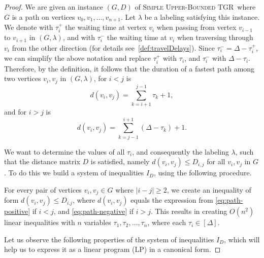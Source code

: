\documentclass[a4paper,UKenglish,cleveref, autoref, thm-restate]{lipics-v2021}
\newcommand{\deltaUpperBound}{\textsc{Simple Upper-Bounded TGR}}
\begin{document}
\begin{proof}
We are given an instance  $(G,D)$ of \deltaUpperBound\, where $G$ is a path on vertices $v_0, v_1, \dots, v_{n+1}$. 
Let $\lambda$ be a labeling satisfying this instance.
We denote with $\tau_i^+$ the waiting time at vertex $v_i$ when passing from vertex $v_{i-1}$ to $v_{i+1}$ in $(G,\lambda)$,
and with $\tau_i^-$ the waiting time at $v_i$ when traversing through $v_i$ from the other direction (for details see~\cref{def:travelDelays}).
Since $\tau_i^- = \Delta - \tau_i^+$, 
we can simplify the above notation and replace $\tau_i^+$ with $\tau_i$, and $\tau_i^-$ with $ \Delta - \tau_i$.
Therefore, by the definition, it follows that the duration of a fastest path among two vertices $v_i, v_j$ in $(G,\lambda)$, for $i < j$
is 
\begin{equation}\label{eq:path-positive}
    d(v_i,v_j)=\sum_{k = i+1}^{j-1} \tau_k + 1,
\end{equation}
and for $i > j$ is 
\begin{equation}\label{eq:path-negative}
d(v_i,v_j)=\sum_{k = j-1}^{i+1} (\Delta - \tau_k) + 1.
\end{equation}

We want to determine the values of all $\tau_i$, and consequently the labeling $\lambda$, such that the distance matrix $D$ is satisfied,
namely $d(v_i,v_j) \leq D_{i,j}$ for all $v_i,v_j$ in $G$.
To do this we build a system of inequalities $I_D$, using the following procedure.

For every pair of vertices $v_i, v_j \in G$ where $|i-j| \geq 2$, we create an inequality of form $d(v_i,v_j) \leq D_{i.j}$, where $d(v_i,v_j)$ equals the expression from \cref{eq:path-positive} if $i < j$, and \cref{eq:path-negative} if $i > j$.
This results in creating $O(n^2)$ linear inequalities with $n$ variables $\tau_1,\tau_2, \dots, \tau_n$,
where each $\tau_i \in [\Delta]$. 

Let us observe the following properties of the system of inequalities $I_D$, which will help us to express it as a linear program (LP) in a canonical form.


\end{proof}
\end{document}
